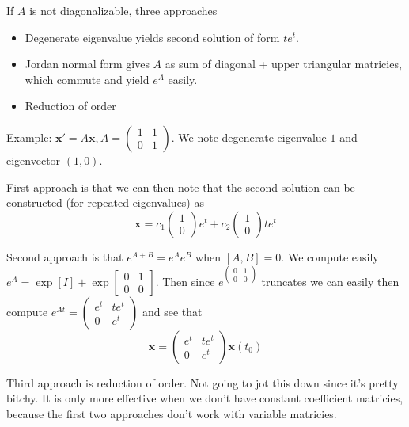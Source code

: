 \documentclass[10pt]{report}
\begin{document}
If $A$ is not diagonalizable, three approaches
\begin{itemize}
    \item Degenerate eigenvalue yields second solution of form $te^t$. 
    \item Jordan normal form gives $A$ as sum of diagonal + upper triangular matricies, which commute and yield $e^A$ easily. 
    \item Reduction of order
\end{itemize}

Example: $\mathbf{x}' = A\mathbf{x}, A = \begin{pmatrix} 1 & 1\\0 & 1 \end{pmatrix} $. We note degenerate eigenvalue $1$ and eigenvector $(1,0)$. 

First approach is that we can then note that the second solution can be constructed (for repeated eigenvalues) as
\begin{equation}
    \mathbf{x} = c_1 \begin{pmatrix} 1\\0 \end{pmatrix} e^t + c_2 \begin{pmatrix} 1\\0 \end{pmatrix} te^{t}
\end{equation}

Second approach is that $e^{A+B} = e^Ae^B$ when $[A,B] = 0$. We compute easily $e^A = \exp[I] + \exp\begin{bmatrix} 0 & 1\\ 0 & 0 \end{bmatrix} $. Then since $e^{\begin{pmatrix} 0 & 1 \\ 0 & 0 \end{pmatrix} }$ truncates we can easily then compute $e^{At} = \begin{pmatrix} e^{t} & te^t\\0 & e^t \end{pmatrix} $ and see that
\begin{equation}
    \mathbf{x} = \begin{pmatrix} e^t & te^t\\0 & e^t \end{pmatrix} \mathbf{x}(t_0)
\end{equation}

Third approach is reduction of order. Not going to jot this down since it's pretty bitchy. It is only more effective when we don't have constant coefficient matricies, because the first two approaches don't work with variable matricies. 
\end{document}
